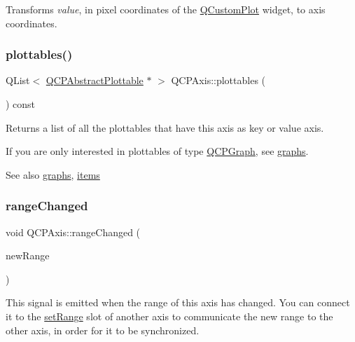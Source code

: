 Transforms {\itshape value}, in pixel coordinates of the \hyperlink{class_q_custom_plot}{Q\+Custom\+Plot} widget, to axis coordinates. \mbox{\label{class_q_c_p_axis_ac5e0f6f65c75efb5fd32275d6e4ef0d6}} 
\subsubsection{\texorpdfstring{plottables()}{plottables()}}
{\footnotesize\ttfamily Q\+List$<$ \hyperlink{class_q_c_p_abstract_plottable}{Q\+C\+P\+Abstract\+Plottable} $\ast$ $>$ Q\+C\+P\+Axis\+::plottables (\begin{DoxyParamCaption}{ }\end{DoxyParamCaption}) const}

Returns a list of all the plottables that have this axis as key or value axis.

If you are only interested in plottables of type \hyperlink{class_q_c_p_graph}{Q\+C\+P\+Graph}, see \hyperlink{class_q_c_p_axis_ad590c0da223697a2727f97a520870fec}{graphs}.

\begin{DoxySeeAlso}{See also}
\hyperlink{class_q_c_p_axis_ad590c0da223697a2727f97a520870fec}{graphs}, \hyperlink{class_q_c_p_axis_a42761bc68e2f3a9f68549d45b73f705b}{items} 
\end{DoxySeeAlso}
\mbox{\label{class_q_c_p_axis_a0894084e4c16a1736534c4095746f910}} 
\subsubsection{\texorpdfstring{range\+Changed}{rangeChanged}\hspace{0.1cm}{\footnotesize\ttfamily [1/2]}}
{\footnotesize\ttfamily void Q\+C\+P\+Axis\+::range\+Changed (\begin{DoxyParamCaption}\item[{const \hyperlink{class_q_c_p_range}{Q\+C\+P\+Range} \&}]{new\+Range }\end{DoxyParamCaption})\hspace{0.3cm}{\ttfamily [signal]}}

This signal is emitted when the range of this axis has changed. You can connect it to the \hyperlink{class_q_c_p_axis_aebdfea5d44c3a0ad2b4700cd4d25b641}{set\+Range} slot of another axis to communicate the new range to the other axis, in order for it to be synchronized.

